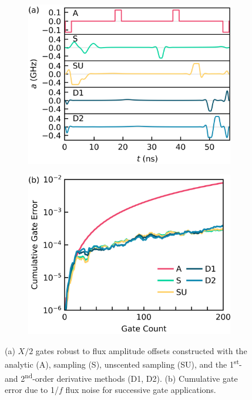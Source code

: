 \begin{figure}[ht]
  \begin{subfigure}{.4\textwidth}
    \includegraphics[width=\linewidth]{assets/f3a.png}
    \caption{}
    \label{fig:stochastica}
  \end{subfigure}\hspace{0.05\textwidth}
  \begin{subfigure}{.4\textwidth}
    \includegraphics[width=\linewidth]{assets/f3b.png}
        \caption{}
    \label{fig:stochasticb}
  \end{subfigure}
  \caption{
    (a) $X/2$ gates robust to flux amplitude offsets constructed with the analytic (A),
    sampling (S), unscented sampling (SU), and the 1\textsuperscript{st}-
    and 2\textsuperscript{nd}-order derivative methods (D1, D2).
    (b) Cumulative gate error due to 1/$f$ flux noise for
    successive gate applications.
  }
  \label{fig:stochastic}
\end{figure}
